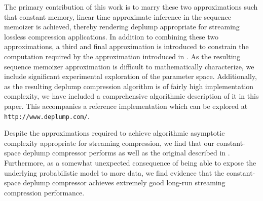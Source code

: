 The primary contribution of this work is to marry these two approximations such that constant memory, linear time approximate inference in the sequence memoizer is achieved, thereby rendering deplump appropriate for streaming lossless compression applications.  In addition to combining these two approximations, a third and final approximation is introduced to constrain the computation required by the approximation introduced in  \citep{Gasthaus2011}. As the resulting sequence memoizer approximation is difficult to mathematically characterize, we include significant experimental exploration of the parameter space.  Additionally, as the resulting deplump compression algorithm is of fairly high implementation complexity, we have included a comprehensive algorithmic description of it in this paper.  This accompanies a reference implementation which can be explored at \texttt{http://www.deplump.com/}.

Despite the approximations required to achieve algorithmic asymptotic complexity appropriate for streaming compression, we find that our constant-space deplump compressor performs as well as the original described in \citep{Gasthaus2010}.  Furthermore, as a somewhat unexpected consequence of being able to expose the underlying probabilistic model to more data, we find evidence that the constant-space deplump compressor achieves extremely good long-run streaming compression performance.